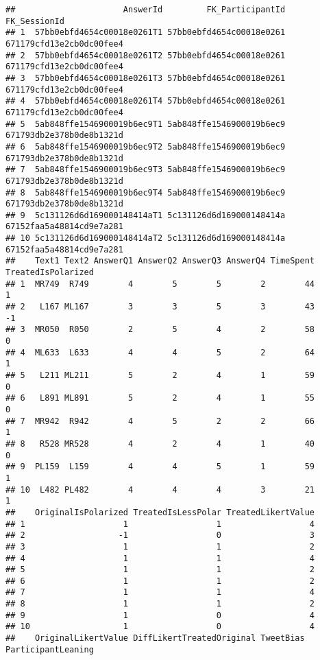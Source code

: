 \documentclass[
]{article}
\begin{document}
\begin{verbatim}
##                      AnswerId         FK_ParticipantId             FK_SessionId
## 1  57bb0ebfd4654c00018e0261T1 57bb0ebfd4654c00018e0261 671179cfd13e2cb0dc00fee4
## 2  57bb0ebfd4654c00018e0261T2 57bb0ebfd4654c00018e0261 671179cfd13e2cb0dc00fee4
## 3  57bb0ebfd4654c00018e0261T3 57bb0ebfd4654c00018e0261 671179cfd13e2cb0dc00fee4
## 4  57bb0ebfd4654c00018e0261T4 57bb0ebfd4654c00018e0261 671179cfd13e2cb0dc00fee4
## 5  5ab848ffe1546900019b6ec9T1 5ab848ffe1546900019b6ec9 671793db2e378b0de8b1321d
## 6  5ab848ffe1546900019b6ec9T2 5ab848ffe1546900019b6ec9 671793db2e378b0de8b1321d
## 7  5ab848ffe1546900019b6ec9T3 5ab848ffe1546900019b6ec9 671793db2e378b0de8b1321d
## 8  5ab848ffe1546900019b6ec9T4 5ab848ffe1546900019b6ec9 671793db2e378b0de8b1321d
## 9  5c131126d6d169000148414aT1 5c131126d6d169000148414a 67152faa5a48814cd9e7a281
## 10 5c131126d6d169000148414aT2 5c131126d6d169000148414a 67152faa5a48814cd9e7a281
##    Text1 Text2 AnswerQ1 AnswerQ2 AnswerQ3 AnswerQ4 TimeSpent TreatedIsPolarized
## 1  MR749  R749        4        5        5        2        44                  1
## 2   L167 ML167        3        3        5        3        43                 -1
## 3  MR050  R050        2        5        4        2        58                  0
## 4  ML633  L633        4        4        5        2        64                  1
## 5   L211 ML211        5        2        4        1        59                  0
## 6   L891 ML891        5        2        4        1        55                  0
## 7  MR942  R942        4        5        2        2        66                  1
## 8   R528 MR528        4        2        4        1        40                  0
## 9  PL159  L159        4        4        5        1        59                  1
## 10  L482 PL482        4        4        4        3        21                  1
##    OriginalIsPolarized TreatedIsLessPolar TreatedLikertValue
## 1                    1                  1                  4
## 2                   -1                  0                  3
## 3                    1                  1                  2
## 4                    1                  1                  4
## 5                    1                  1                  2
## 6                    1                  1                  2
## 7                    1                  1                  4
## 8                    1                  1                  2
## 9                    1                  0                  4
## 10                   1                  0                  4
##    OriginalLikertValue DiffLikertTreatedOriginal TweetBias ParticipantLeaning

\end{verbatim}
\end{document}
